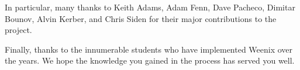 In particular, many thanks to Keith Adams, Adam Fenn, Dave Pacheco, Dimitar Bounov, Alvin Kerber, and Chris Siden for their major contributions to the project.

Finally, thanks to the innumerable students who have implemented Weenix over the years. We hope the knowledge you gained in the process has served you well.

